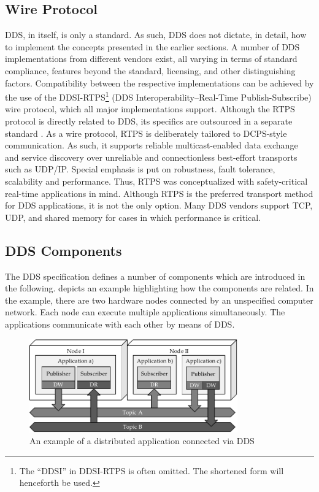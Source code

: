 \subsection{Wire Protocol}
DDS, in itself, is only a standard. As such, DDS does not dictate, in detail, how to implement the concepts presented in the earlier sections. A number of DDS implementations from different vendors exist, all varying in terms of standard compliance, features beyond the standard, licensing, and other distinguishing factors. Compatibility between the respective implementations can be achieved by the use of the DDSI-RTPS\footnote{The ``DDSI'' in DDSI-RTPS is often omitted. The shortened form will henceforth be used.} (DDS Interoperability--Real-Time Publish-Subscribe) wire protocol, which all major implementations support. Although the RTPS protocol is directly related to DDS, its specifics are outsourced in a separate standard \cite{rtps-2.2-standard}.
As a wire protocol, RTPS is deliberately tailored to DCPS-style communication. As such, it supports reliable multicast-enabled data exchange and service discovery over unreliable and connectionless best-effort transports such as UDP/IP. Special emphasis is put on robustness, fault tolerance, scalability and performance. Thus, RTPS was conceptualized with safety-critical real-time applications in mind. Although RTPS is the preferred transport method for DDS applications, it is not the only option. Many DDS vendors support TCP, UDP, and shared memory for cases in which performance is critical.

%
%
%
%
%
%
%
%
%
%
%
%
%
%
\subsection{DDS Components}
The DDS specification defines a number of components which are introduced in the following.  depicts an example highlighting how the components are related. In the example, there are two hardware nodes connected by an unspecified computer network. Each node can execute multiple applications simultaneously. The applications communicate with each other by means of DDS.


\begin{figure}[htpb]
  \centering
  \includegraphics[width=0.8\textwidth]{figures/dds.pdf}
  \caption[An example of a distributed application connected via DDS]{An example of a distributed application connected via DDS}\label{fig:dds}
\end{figure}

